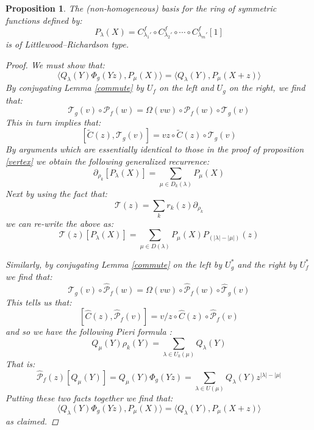 \documentclass[12pt,dvips]{amsart}
\newtheorem{proposition}{Proposition}[section]
\begin{document}
\begin{proposition}
The (non-homogeneous) basis for the ring of symmetric functions defined by:
$$ P_\lambda(X) = C^f_{\lambda_1'} \circ C^f_{\lambda_2'} \circ \cdots \circ C^f_{\lambda_m'}[1]$$
is of Littlewood--Richardson type.
\begin{proof}
We must show that:
$$ \langle Q_\lambda(Y) \Phi_g(Yz), P_\mu(X) \rangle = \langle Q_\lambda(Y), P_\mu(X+z) \rangle $$
By conjugating Lemma \ref{commute} by $U_f$ on the left and $U_g$ on the right, we find that:
$$ \mathcal{T}_{g}(v) \circ \mathcal{P}_{f}(w) = \Omega(vw) \circ \mathcal{P}_{f}(w) \circ \mathcal{T}_{g}(v) $$
This in turn implies that:
$$ [ \tilde{C}(z), \mathcal{T}_{g}(v)] = vz \circ \tilde{C}(z) \circ \mathcal{T}_{g}(v) $$
By arguments which are essentially identical to those in the proof of proposition \ref{vertex} we obtain the following generalized recurrence:
$$ \partial_{\rho_k}[P_\lambda(X)] = \sum_{\mu \in D_k(\lambda)} P_\mu(X)$$
Next by using the fact that:
$$ \mathcal{T}(z) = \sum_k r_k(z) \partial_{\rho_k} $$
we can re-write the above as:
$$ \mathcal{T}(z)[P_\lambda(X)] = \sum_{\mu \in D(\lambda)} P_\mu(X) P_{(|\lambda| - |\mu|)}(z) $$
\par\bigskip
Similarly, by conjugating Lemma \ref{commute} on the left by $U^*_g$ and the right by $U^*_f$ we find that:
$$ \hat{\mathcal{T}}_{g}(v) \circ \hat{\mathcal{P}}_{f}(w) = \Omega(vw) \circ \hat{\mathcal{P}}_{f}(w) \circ \hat{\mathcal{T}}_{g}(v) $$
This tells us that:
$$ [  \hat{C}(z), \hat{\mathcal{P}}_{f}(v) ] = v/z \circ \hat{C}(z) \circ \hat{\mathcal{P}}_{f}(v) $$
and so we have the following Pieri formula	:
$$ Q_\mu(Y) \rho_k(Y)  = \sum_{\lambda \in U_k(\mu)} Q_\lambda(Y)$$
That is:
$$ \hat{\mathcal{P}}_{f}(z)[Q_\mu(Y)] = Q_\mu(Y) \Phi_g(Yz) = \sum_{\lambda \in U(\mu)} Q_\lambda(Y) z^{|\lambda| - |\mu|	} $$
Putting these two facts together we find that:
$$ \langle Q_\lambda(Y) \Phi_g(Yz), P_\mu(X) \rangle = \langle Q_\lambda(Y), P_\mu(X+z) \rangle $$
as claimed.
\end{proof}
\end{proposition}
\end{document}
